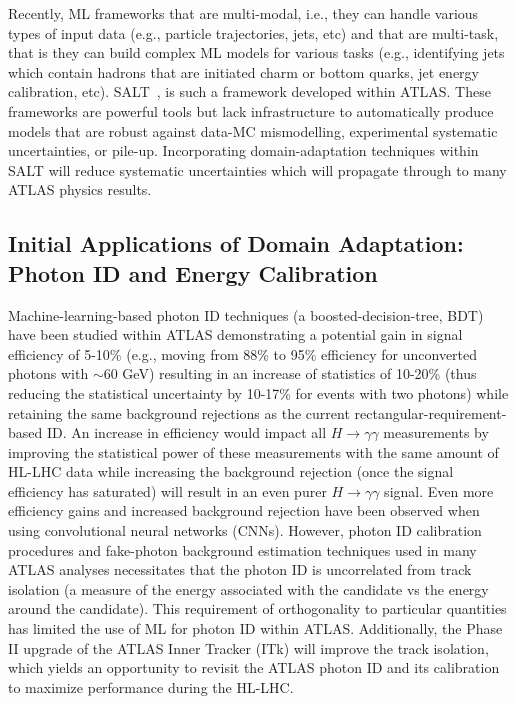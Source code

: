 \documentclass[letter, USenglish, 11pt, subfigure]{article}
\begin{document}
Recently, ML frameworks that are multi-modal, i.e., they can handle various types of input data (e.g., particle trajectories, jets, etc) and that are multi-task, that is they can build complex ML models for various tasks (e.g., identifying jets which contain hadrons that are initiated charm or bottom quarks, jet energy calibration, etc). SALT~\cite{salt}, is such a framework developed within ATLAS. These frameworks are powerful tools but lack infrastructure to automatically produce models that are robust against data-MC mismodelling, experimental systematic uncertainties, or pile-up. Incorporating domain-adaptation techniques within SALT will reduce systematic uncertainties which will propagate through to many ATLAS physics results.

\subsection{Initial Applications of Domain Adaptation: Photon ID and Energy Calibration}

Machine-learning-based photon ID techniques (a boosted-decision-tree, BDT) have been studied within ATLAS demonstrating a potential gain in signal efficiency of 5-10\% (e.g., moving from 88\% to 95\% efficiency for unconverted photons with \pt$\sim$60 GeV) resulting in an increase of statistics of 10-20\% (thus reducing the statistical uncertainty by 10-17\% for events with two photons) while retaining the same background rejections as the current rectangular-requirement-based ID. An increase in efficiency would impact all $H\to\gamma\gamma$ measurements by improving the statistical power of these measurements with the same amount of HL-LHC data while increasing the background rejection (once the signal efficiency has saturated) will result in an even purer $H\to\gamma\gamma$ signal. Even more efficiency gains and increased background rejection have been observed when using convolutional neural networks (CNNs). However, photon ID calibration procedures and fake-photon background estimation techniques used in many ATLAS analyses necessitates that the photon ID is uncorrelated from track isolation (a measure of the energy associated with the candidate vs the energy around the candidate). This requirement of orthogonality to particular quantities has limited the use of ML for photon ID within ATLAS. Additionally, the Phase II upgrade of the ATLAS Inner Tracker (ITk) will improve the track isolation, which yields an opportunity to revisit the ATLAS photon ID and its calibration to maximize performance during the HL-LHC. 
\end{document}
